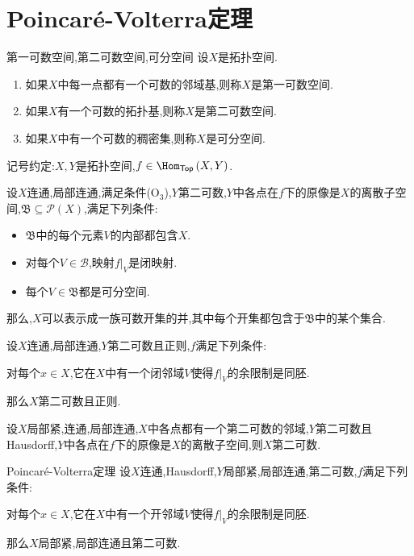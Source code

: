 \section{Poincar\'{e}-Volterra定理}

\begin{definition}{第一可数空间,第二可数空间,可分空间}{}
	设$X$是拓扑空间.
	\begin{enumerate}
		\item 如果$X$中每一点都有一个可数的邻域基,则称$X$是第一可数空间.
		\item 如果$X$有一个可数的拓扑基,则称$X$是第二可数空间.
		\item 如果$X$中有一个可数的稠密集,则称$X$是可分空间.
	\end{enumerate}
\end{definition}

记号约定:$X,Y$是拓扑空间,$f\in\Hom_{\mathsf{Top}}\left(X,Y\right)$.

\begin{theorem}{}{}
	设$X$连通,局部连通,满足条件($\mathrm{O_{3}}$),$Y$第二可数,$Y$中各点在$f$下的原像是$X$的离散子空间,$\mathfrak{B}\subseteq\mathcal{P}\left(X\right)$,满足下列条件:
	\begin{itemize}
		\item $\mathfrak{B}$中的每个元素$V$的内部都包含$X$.
		\item 对每个$V\in\mathcal{B}$,映射$f|_{V}$是闭映射.
		\item 每个$V\in\mathfrak{B}$都是可分空间.
	\end{itemize}
	那么,$X$可以表示成一族可数开集的并,其中每个开集都包含于$\mathfrak{B}$中的某个集合.
\end{theorem}

\begin{corollary}{}{}
	设$X$连通,局部连通,$Y$第二可数且正则,$f$满足下列条件:
	\begin{center}
		对每个$x\in X$,它在$X$中有一个闭邻域$V$使得$f|_{V}$的余限制是同胚.
	\end{center}
	那么$X$第二可数且正则.
\end{corollary}

\begin{corollary}{}{}
	设$X$局部紧,连通,局部连通,$X$中各点都有一个第二可数的邻域,$Y$第二可数且Hausdorff,$Y$中各点在$f$下的原像是$X$的离散子空间,则$X$第二可数.
\end{corollary}

\begin{corollary}{Poincar\'{e}-Volterra定理}{}
	设$X$连通,Hausdorff,$Y$局部紧,局部连通,第二可数,$f$满足下列条件:
	\begin{center}
		对每个$x\in X$,它在$X$中有一个开邻域$V$使得$f|_{V}$的余限制是同胚.
	\end{center}
	那么$X$局部紧,局部连通且第二可数.
\end{corollary}

